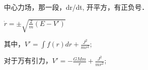 中心力场，那一段，dr/dt, 开平方，有正负号．

$\dot{r}=\pm\sqrt{\frac{2}{m}(E-V')}$

其中，$V'=\int{f(r)dr}+\frac{J^2}{mr^2}$;

对于万有引力，$V'=-\frac{GMm}{r}+\frac{J^2}{mr^2}$;
